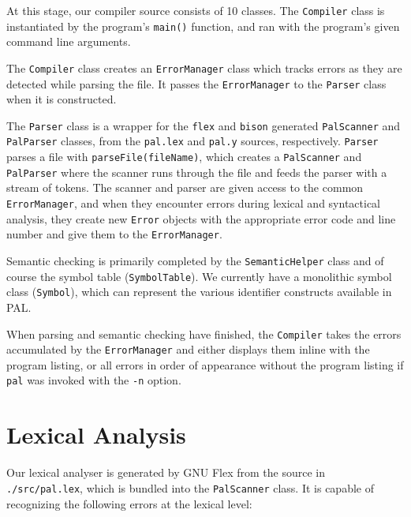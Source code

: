 \documentclass{article}
\begin{document}
At this stage, our compiler source consists of 10 classes. The \texttt{Compiler} class is instantiated by 
the program's \texttt{main()} function, and ran with the program's given command line arguments. 

The \texttt{Compiler} class creates an \texttt{ErrorManager}
class which tracks errors as they are detected while parsing the file. It passes the \texttt{ErrorManager}
to the \texttt{Parser} class when it is constructed.

The \texttt{Parser} class is a wrapper for the \texttt{flex} and \texttt{bison}
generated \texttt{PalScanner} and \texttt{PalParser} classes, from the
\texttt{pal.lex} and \texttt{pal.y} sources, respectively. \texttt{Parser}
parses a file with \texttt{parseFile(fileName)}, which creates a
\texttt{PalScanner} and \texttt{PalParser} where the scanner runs through
the file and feeds the parser with a stream of tokens.  The scanner and
parser are given access to the common \texttt{ErrorManager}, and when they
encounter errors during lexical and syntactical analysis, they create new
\texttt{Error} objects with the appropriate error code and line number and
give them to the \texttt{ErrorManager}.

Semantic checking is primarily completed by the \texttt{SemanticHelper} class and of course
the symbol table (\texttt{SymbolTable}). We currently have a monolithic symbol class (\texttt{Symbol}),
which can represent the various identifier constructs available in PAL.

When parsing and semantic checking have finished, the \texttt{Compiler} takes the errors accumulated by
the \texttt{ErrorManager} and either displays them inline with the program
listing, or all errors in order of appearance without the program listing if 
\texttt{pal} was invoked with the \texttt{-n} option.


\section*{Lexical Analysis}

Our lexical analyser is generated by GNU Flex from the source in \texttt{./src/pal.lex}, which
is bundled into the \texttt{PalScanner} class. It is capable of recognizing the following
errors at the lexical level:
\end{document}
